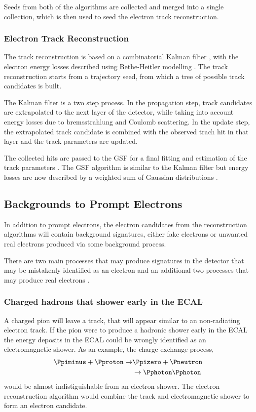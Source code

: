 Seeds from both of the algorithms are collected and merged into a single
collection, which is then used to seed the electron track reconstruction.

\subsubsection{Electron Track Reconstruction}
The track reconstruction is based on a combinatorial Kalman filter \cite{kalman},
with the electron energy losses described using Bethe-Heitler
modelling \cite{bethe}.
The track reconstruction starts from a trajectory seed, from which a tree of
possible track candidates is built. 

The Kalman filter is a two step process. In the propagation step, track
candidates are extrapolated to the next layer of the detector, while taking into
 account energy losses due to bremsstrahlung and Coulomb scattering.  In
the update step, the extrapolated track candidate is combined with the observed
trach hit in that layer and the track parameters are updated. 

The collected hits are passed to the {GSF} for a final fitting and estimation
of the track parameters \cite{cmsgsf}. The {GSF} algorithm is similar to the
Kalman filter but energy losses are now described by a weighted sum of Gaussian
distributions \cite{gsf}.

\subsection{Backgrounds to Prompt Electrons}
In addition to prompt electrons, the electron candidates from the reconstruction
algorithms will contain background signatures, either fake electrons or unwanted
real electrons produced via some background process.

There are two main processes that may produce signatures in the detector that
may be mistakenly identified as an electron and an additional
two processes that may produce real electrons \cite{nikos}.

\subsubsection{Charged hadrons that shower early in the ECAL}
A charged pion will leave a track, that will appear similar to an non-radiating
electron track.
If the pion were to produce a hadronic shower early in the ECAL
the energy deposits in the ECAL could be wrongly identified as an
electromagnetic shower.
As an example, the charge exchange process,
\begin{align}
\Ppiminus + \Pproton \to &\Ppizero + \Pneutron \nonumber \\
                         &\to \Pphoton\Pphoton
\end{align}
would be almost indistiguishable from an electron shower.
The electron reconstruction algorithm would combine the
track and electromagnetic shower to form an electron candidate\cite{nikos}.

